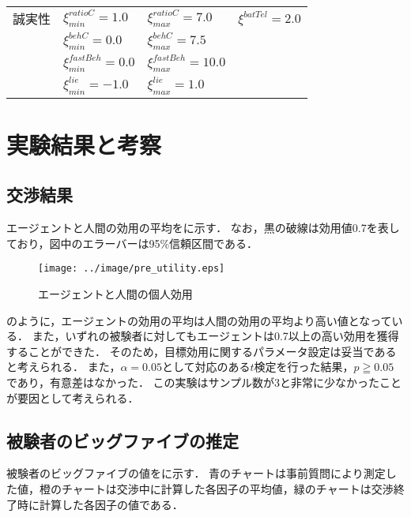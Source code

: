 \begin{table}[!tb]
\begin{tabular}{llll}
        誠実性 & $\xi_{min}^{\mathit{ratioC}} = 1.0$ & $\xi_{max}^{\mathit{ratioC}} = 7.0$ & $\xi^{batTel} = 2.0$ \\
        & $\xi_{min}^{\mathit{behC}} = 0.0$ & $\xi_{max}^{\mathit{behC}} = 7.5$ \\
        & $\xi_{min}^{\mathit{fastBeh}} = 0.0$ & $\xi_{max}^{\mathit{fastBeh}} = 10.0$ \\
        & $\xi_{min}^{\mathit{lie}} = -1.0$ & $\xi_{max}^{\mathit{lie}} = 1.0$ \\ \bottomrule
    \end{tabular}
    \label{tab:pre_xi-param}
\end{table}

\section{実験結果と考察}
\subsection{交渉結果}
エージェントと人間の効用の平均をに示す．
なお，黒の破線は効用値0.7を表しており，図中のエラーバーは95\%信頼区間である．

\begin{figure}[bt]
    \centering
    \texttt{[image: ../image/pre\_utility.eps]}
    \caption{エージェントと人間の個人効用}
    \label{fig:pre_util}
\end{figure}

のように，エージェントの効用の平均は人間の効用の平均より高い値となっている．
また，いずれの被験者に対してもエージェントは0.7以上の高い効用を獲得することができた．
そのため，目標効用に関するパラメータ設定は妥当であると考えられる．
また，$\alpha = 0.05$として対応のある$t$検定を行った結果，$p \geqq 0.05$であり，有意差はなかった．
この実験はサンプル数が3と非常に少なかったことが要因として考えられる．

\subsection{被験者のビッグファイブの推定}
被験者のビッグファイブの値をに示す．
青のチャートは事前質問により測定した値，橙のチャートは交渉中に計算した各因子の平均値，緑のチャートは交渉終了時に計算した各因子の値である．

